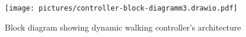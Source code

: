 \begin{figure}[t]
    \centering
    \texttt{[image: pictures/controller-block-diagramm3.drawio.pdf]}
        \caption{Block diagram showing dynamic walking controller's architecture}
    \label{fig:controller-architecture}
    \vspace{-1.5em}
\end{figure}

